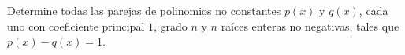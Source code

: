 Determine todas las parejas de polinomios no constantes $p(x)$ y $q(x)$, cada uno con coeficiente principal $1$, grado $n$ y $n$ raíces enteras no negativas, tales que $p(x)-q(x)=1$. 
